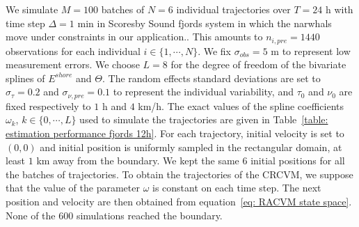 \documentclass[11pt]{article}
\newcommand {\1}{\mathbb{1}}
\theoremstyle{definition}
\theoremstyle{remark}
\theoremstyle{remark}
\begin{document}
We simulate $M=100$ batches of $N=6$ individual trajectories over $T=24$ h with time step $\Delta=1$ min in Scoresby Sound fjords system in which the narwhals move under constraints in our application.. This amounts to $n_{i,pre}=1440$ observations for each individual $i \in \{1,\cdots,N\}$. We fix $\sigma_{obs}=5$ m to represent low measurement errors. 
We choose $L=8$ for the degree of freedom of the bivariate splines of $E^{shore}$ and $\Theta$. The random effects standard deviations are set to $\sigma_{\tau}=0.2$ and $\sigma_{\nu,pre}=0.1$ to represent the individual variability, and $\tau_{0}$ and $\nu_{0}$ are fixed respectively to $1$ h and $4$ km/h. The exact values of the spline coefficients $\omega_k$, $k \in \{0,\cdots,L\}$ used to simulate the trajectories are given in Table~\ref{table: estimation performance fjords 12h}. For each trajectory, initial velocity is set to $(0,0)$ and initial position is uniformly sampled in the rectangular domain, at least $1$ km away from the boundary. We kept the same $6$ initial positions for all the batches of trajectories. To obtain the trajectories of the CRCVM, we suppose that the value of the parameter $\omega$ is constant on each time step. The next position and velocity are then obtained from equation~\ref{eq: RACVM state space}. None of the $600$ simulations reached the boundary. \\

\end{document}

